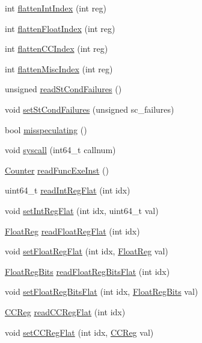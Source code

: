 \begin{DoxyCompactItemize}
\item 
int \hyperlink{classProxyThreadContext_aa529f2d70520c578e3e29b3bf1a66312}{flattenIntIndex} (int reg)
\item 
int \hyperlink{classProxyThreadContext_ab9ea3f8f1a21df875c7273c7377dfac1}{flattenFloatIndex} (int reg)
\item 
int \hyperlink{classProxyThreadContext_ac33d74353e36a595ec48962cd0446320}{flattenCCIndex} (int reg)
\item 
int \hyperlink{classProxyThreadContext_a5adc7d32f3a8bd75c5dc0a62d95564fd}{flattenMiscIndex} (int reg)
\item 
unsigned \hyperlink{classProxyThreadContext_a25b995a791e41965e088d8bf3f2bf859}{readStCondFailures} ()
\item 
void \hyperlink{classProxyThreadContext_abbe779fa43c72cd485ddb736ab17ff61}{setStCondFailures} (unsigned sc\_\-failures)
\item 
bool \hyperlink{classProxyThreadContext_a99768639c728ee835cce54b8b42b3d8f}{misspeculating} ()
\item 
void \hyperlink{classProxyThreadContext_a36e0b96120fcbbc2ee8699158f7be5c2}{syscall} (int64\_\-t callnum)
\item 
\hyperlink{base_2types_8hh_ae1475755791765b8e6f6a8bb091e273e}{Counter} \hyperlink{classProxyThreadContext_a2b0bef6e1b1ac24e9322fbd09a511d11}{readFuncExeInst} ()
\item 
uint64\_\-t \hyperlink{classProxyThreadContext_aed7abd4afcb954f8612e4ef1fe73317a}{readIntRegFlat} (int idx)
\item 
void \hyperlink{classProxyThreadContext_ae3b8c9c2c1ae95767f0703357957a3f8}{setIntRegFlat} (int idx, uint64\_\-t val)
\item 
\hyperlink{classThreadContext_a75484259f1855aabc8d74c6eb1cfe186}{FloatReg} \hyperlink{classProxyThreadContext_aaa32dc9f4a8719a465c267fed47cbdc6}{readFloatRegFlat} (int idx)
\item 
void \hyperlink{classProxyThreadContext_a71ec23ca2c029120932e5af4babc0da1}{setFloatRegFlat} (int idx, \hyperlink{classThreadContext_a75484259f1855aabc8d74c6eb1cfe186}{FloatReg} val)
\item 
\hyperlink{classThreadContext_aab5eeae86499f9bfe15ef79360eccc64}{FloatRegBits} \hyperlink{classProxyThreadContext_a2fa29585c9694c9bffcce2a63f871759}{readFloatRegBitsFlat} (int idx)
\item 
void \hyperlink{classProxyThreadContext_acd974292ff0461c2e94c0b5a1126b503}{setFloatRegBitsFlat} (int idx, \hyperlink{classThreadContext_aab5eeae86499f9bfe15ef79360eccc64}{FloatRegBits} val)
\item 
\hyperlink{classThreadContext_a0c9de550a32808e6a25b54b6c791d5ab}{CCReg} \hyperlink{classProxyThreadContext_a78f8bb511732f8abab3bd11a18d32072}{readCCRegFlat} (int idx)
\item 
void \hyperlink{classProxyThreadContext_a6dec2284dd5904f992642f24bb289f14}{setCCRegFlat} (int idx, \hyperlink{classThreadContext_a0c9de550a32808e6a25b54b6c791d5ab}{CCReg} val)
\end{DoxyCompactItemize}

